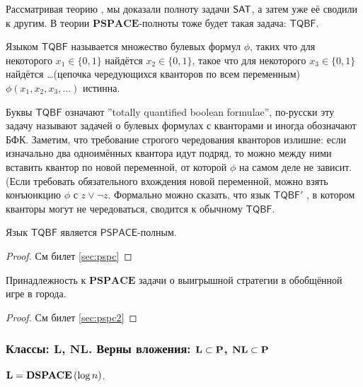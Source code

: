  Рассматривая теорию \npc, мы доказали полноту задачи $\mathsf{SAT}$, а затем уже её сводили к другим. В теории $\mathbf{PSPACE}$-полноты тоже будет такая задача: $\mathsf{TQBF}$.

\begin{definition}
    Языком $\mathsf{TQBF}$ называется множество булевых формул $\phi$, таких что для некоторого $x_1 \in \{ 0, 1 \}$ найдётся $x_2 \in \{ 0, 1 \}$, такое что для некоторого $x_3 \in \{ 0, 1 \}$ найдётся \ldots (цепочка чередующихся кванторов по всем переменным) $\phi(x_1, x_2, x_3, \ldots)$ истинна.

\end{definition}

Буквы $\mathsf{TQBF}$ означают ''totally quantified boolean formulae'', по-русски эту задачу называют задачей о булевых формулах с кванторами и иногда обозначают
БФК. Заметим, что требование строгого чередования кванторов излишне: если изначально два одноимённых квантора идут подряд, то можно между ними
вставить квантор по новой переменной, от которой $\phi$ на самом деле не зависит. (Если требовать обязательного вхождения новой переменной, можно взять
конъюнкцию $\phi$ с $z \vee \neg z$. Формально можно сказать, что язык $\mathsf{TQBF}'$
, в котором
кванторы могут не чередоваться, сводится к обычному $\mathsf{TQBF}$.

\begin{theorem}
     Язык $\mathsf{TQBF}$ является $\mathsf{PSPACE}$-полным.
\end{theorem}

\begin{proof}
    См билет \ref{sec:pspc}
\end{proof}

\begin{theorem}
     Принадлежность к $\mathbf{PSPACE}$ задачи о выигрышной стратегии в обобщённой игре в города.
\end{theorem}

\begin{proof}
    См билет \ref{sec:pspc2}
\end{proof}


\subsubsection{Классы: $\mathbf{L}$, $\mathbf{NL}$. Верны вложения: $\mathbf{L} \subset \textbf{P}$, $\mathbf{NL} \subset \textbf{P}$ }
 

\begin{definition}
$\mathbf{L} = \textbf{DSPACE}\left({\log n}\right)$.
\end{definition}

